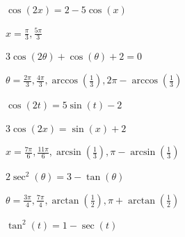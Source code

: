 \documentclass{ximera}
\begin{document}
\begin{question}
\begin{problem}
\end{problem}

\begin{problem}
$\cos(2x) = 2 - 5\cos(x)$

\begin{solution}
$x=\frac{\pi}{3}, \frac{5\pi}{3}$
\end{solution}
\end{problem}

\begin{problem}
$3\cos(2 \theta ) + \cos(\theta) + 2 = 0$

\begin{solution}
$\theta = \frac{2\pi}{3}, \frac{4\pi}{3}, \arccos\left(\frac{1}{3}\right), 2\pi -\arccos\left(\frac{1}{3}\right) $
\end{solution}
\end{problem}

\begin{problem}
$\cos(2t) = 5\sin(t) - 2$

\begin{selectAll}
  \end{selectAll}
\end{problem}

\begin{problem}
$3\cos(2x) = \sin(x) + 2$

\begin{solution}
$x = \frac{7\pi}{6}, \frac{11\pi}{6}, \arcsin\left(\frac{1}{3}\right), \pi - \arcsin\left(\frac{1}{3}\right) $
\end{solution}
\end{problem}
 
\begin{problem} 
$2\sec^{2}(\theta) = 3 - \tan(\theta)$

\begin{solution}
$\theta=\frac{3\pi}{4}, \frac{7\pi}{4}, \arctan\left(\frac{1}{2}\right), \pi +\arctan\left(\frac{1}{2}\right) $
\end{solution}
\end{problem}

\begin{problem}
$\tan^{2}(t) = 1-\sec(t)$

\begin{selectAll}
  \end{selectAll}
\end{problem}



\end{question}
\end{document}
